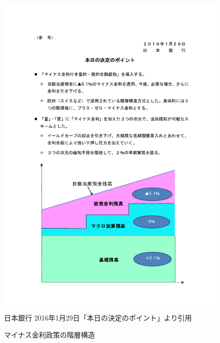 \documentclass[12pt]{jarticle}
\begin{document}
{%
\begin{figure}[H]
  \centering
  \caption{マイナス金利政策の階層構造}
  \includegraphics[width=17cm]{currentaccount.pdf}

  日本銀行 2016年1月29日「本日の決定のポイント」より引用
\end{figure}


}
\end{document}
